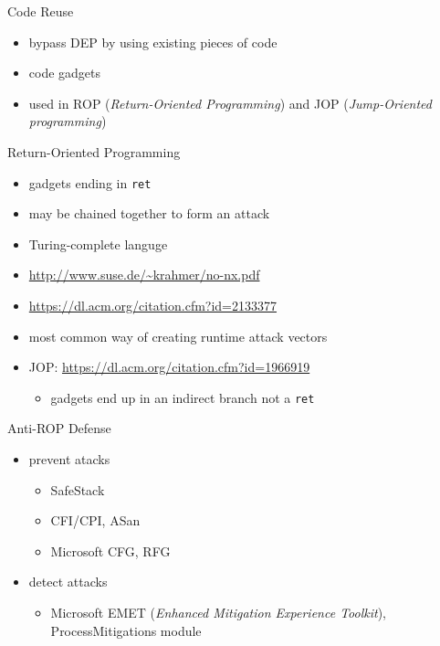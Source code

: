 \documentclass{curs}
\begin{document}
\begin{frame}{Code Reuse}
  \begin{itemize}
    \pause \item bypass DEP by using existing pieces of code
    \pause \item code gadgets
    \pause \item used in ROP (\textit{Return-Oriented Programming}) and JOP (\textit{Jump-Oriented programming})
  \end{itemize}
\end{frame}

\begin{frame}{Return-Oriented Programming}
  \begin{itemize}
    \pause \item gadgets ending in \texttt{ret}
    \pause \item may be chained together to form an attack
    \pause \item Turing-complete languge
    \pause \item \url{http://www.suse.de/~krahmer/no-nx.pdf}
    \pause \item \url{https://dl.acm.org/citation.cfm?id=2133377}
    \pause \item most common way of creating runtime attack vectors
    \pause \item JOP: \url{https://dl.acm.org/citation.cfm?id=1966919}
      \begin{itemize}
        \pause \item gadgets end up in an indirect branch not a \texttt{ret}
      \end{itemize}
  \end{itemize}
\end{frame}

\begin{frame}{Anti-ROP Defense}
  \begin{itemize}
    \pause \item prevent atacks
      \begin{itemize}
        \pause \item SafeStack
        \pause \item CFI/CPI, ASan
        \pause \item Microsoft CFG, RFG
      \end{itemize}
    \pause \item detect attacks
      \begin{itemize}
        \pause \item Microsoft EMET (\textit{Enhanced Mitigation Experience Toolkit}), ProcessMitigations module
      \end{itemize}
  \end{itemize}
\end{frame}
\end{document}
